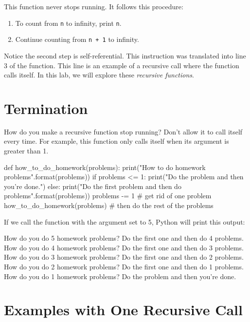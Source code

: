 \documentclass[11pt]{cselabheader}
\begin{document}
This function never stops running. It follows this procedure:

\begin{enumerate}
\item To count from \texttt{n} to infinity, print \texttt{n}.
\item Continue counting from \texttt{n + 1} to infinity.
\end{enumerate}

Notice the second step is self-referential. This instruction was
translated into line 3 of the  function. This
line is an example of a recursive call where the function calls
itself.  In this lab, we will explore these \textsl{recursive
functions}.

\section{Termination}

How do you make a recursive function stop running?  Don't allow it to
call itself every time. For example, this function only calls itself
when its argument  is greater than 1.

\begin{python3code}
def how_to_do_homework(problems):
    print("How to do {} homework problems".format(problems))
    if problems <= 1:
        print("Do the problem and then you're done.")
    else:
        print("Do the first problem and then do {} problems".format(problems))
        problems -= 1  # get rid of one problem
        how_to_do_homework(problems) # then do the rest of the problems
\end{python3code}

If we call the function with the argument  set to 5,
Python will print this output:

\begin{verbatimcode}
How do you do 5 homework problems?
Do the first one and then do 4 problems.
How do you do 4 homework problems?
Do the first one and then do 3 problems.
How do you do 3 homework problems?
Do the first one and then do 2 problems.
How do you do 2 homework problems?
Do the first one and then do 1 problems.
How do you do 1 homework problems?
Do the problem and then you're done.
\end{verbatimcode}

\section{Examples with One Recursive Call}
\end{document}
